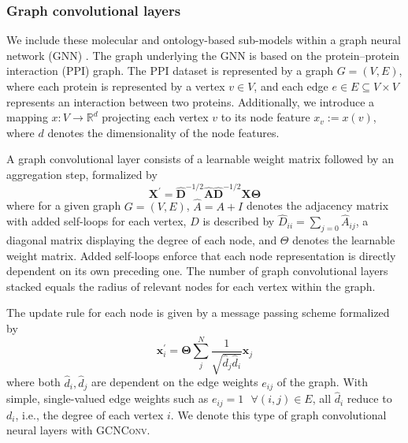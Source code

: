 \documentclass{bioinfo}
\renewcommand{\cite}{\citep}
\begin{document}
\subsubsection{Graph convolutional layers}

We include these molecular and ontology-based sub-models within a
graph neural network (GNN) \cite{GCNConv}. The graph underlying the GNN is
based on the protein--protein interaction (PPI) graph. The PPI dataset
is represented by a graph $G=(V,E)$, where each protein is represented
by a vertex $v\in V$, and each edge $e\in E\subseteq V\times V$
represents an interaction between two proteins. Additionally, we
introduce a mapping $x:V\rightarrow\mathbb{R}^{d}$ projecting each
vertex $v$ to its node feature $x_v := x(v)$, where $d$ denotes the
dimensionality of the node features.
 
A graph convolutional layer \cite{GCNConv} consists of a learnable
weight matrix followed by an aggregation step, formalized by
\begin{equation}
	\mathbf{X}^{\prime} = \mathbf{\hat{D}}^{-1/2} \mathbf{\hat{A}}
	\mathbf{\hat{D}}^{-1/2} \mathbf{X} \mathbf{\Theta}
\end{equation}
where for a given graph $G=(V,E)$, $\hat{A} = A + I$ denotes the
adjacency matrix with added self-loops for each vertex, $D$ is
described by $\hat{D}_{ii} = \sum_{j=0} \hat{A}_{ij}$, a diagonal
matrix displaying the degree of each node, and $\Theta$ denotes the
learnable weight matrix. Added self-loops enforce that each node
representation is directly dependent on its own preceding one. The
number of graph convolutional layers stacked equals the radius of
relevant nodes for each vertex within the graph.

The update rule for each node is given by a message passing scheme
formalized by
\begin{equation}
	\mathbf{x}^{\prime}_i = \mathbf{\Theta} \sum^{N}_{j}
	\frac{1}{\sqrt{\hat{d}_j \hat{d}_i}} \mathbf{x}_j
\end{equation}
where both $\hat{d}_i, \hat{d}_j$ are dependent on the edge weights
$e_{ij}$ of the graph. With simple, single-valued edge weights such as
$e_{ij}=1 \text{ }\forall (i,j)\in E$, all $\hat{d}_i$ reduce to
$d_i$, i.e., the degree of each vertex $i$. We denote this type of
graph convolutional neural layers with \textsc{GCNConv}.
\end{document}
